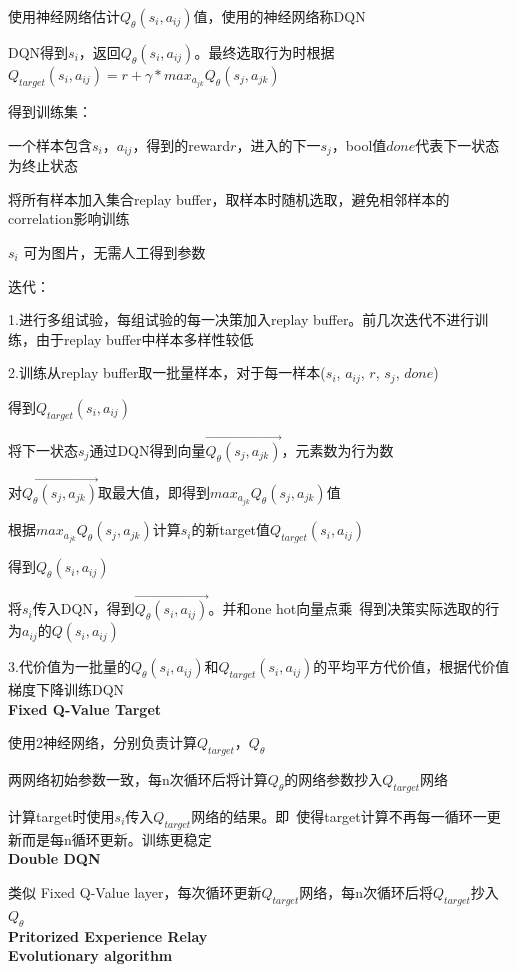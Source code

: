 \documentclass[UTF8]{ctexart}
\begin{document}
  使用神经网络估计$Q_{\theta}(s_i, a_{ij})$值，使用的神经网络称DQN
  
  DQN得到$s_i$，返回$Q_{\theta}(s_i, a_{ij})$。最终选取行为时根据$Q_{target}(s_i, a_{ij}) = r + \gamma * max_{a_{jk}} Q_{\theta}(s_j, a_{jk})$

  得到训练集：

  \quad 一个样本包含$s_i$，$a_{ij}$，得到的reward$r$，进入的下一$s_j$，bool值$done$代表下一状态为终止状态

  \quad 将所有样本加入集合replay buffer，取样本时随机选取，避免相邻样本的correlation影响训练

  \quad $s_i$ 可为图片，无需人工得到参数
  
  迭代：
  
  \quad 1.进行多组试验，每组试验的每一决策加入replay buffer。前几次迭代不进行训练，由于replay buffer中样本多样性较低
  
  \quad 2.训练从replay buffer取一批量样本，对于每一样本($s_i$, $a_{ij}$, $r$, $s_j$, $done$)

  \quad \quad 得到$Q_{target}(s_i, a_{ij})$
  
  \quad \quad \quad 将下一状态$s_j$通过DQN得到向量$\vec{Q_{\theta}(s_j, a_{jk})}$，元素数为行为数

  \quad \quad \quad 对$\vec{Q_{\theta}(s_j, a_{jk})}$取最大值，即得到$max_{a_{jk}} Q_{\theta}(s_j, a_{jk})$值

  \quad \quad \quad 根据$max_{a_{jk}} Q_{\theta}(s_j, a_{jk})$计算$s_i$的新target值$Q_{target}(s_i, a_{ij})$

  \quad \quad 得到$Q_{\theta}(s_i, a_{ij})$

  \quad \quad \quad 将$s_i$传入DQN，得到$\vec{Q_{\theta}(s_i, a_{ij})}$。并和one hot向量点乘\ 得到决策实际选取的行为$a_{ij}$的$Q(s_i, a_{ij})$

  \quad 3.代价值为一批量的$Q_{\theta}(s_i, a_{ij})$和$Q_{target}(s_i, a_{ij})$的平均平方代价值，根据代价值梯度下降训练DQN\\
\textbf{Fixed Q-Value Target}

  使用2神经网络，分别负责计算$Q_{target}$，$Q_{\theta}$

  两网络初始参数一致，每n次循环后将计算$Q_{\theta}$的网络参数抄入$Q_{target}$网络

  计算target时使用$s_i$传入$Q_{target}$网络的结果。即\ 使得target计算不再每一循环一更新而是每n循环更新。训练更稳定\\
\textbf{Double DQN} 

  类似 Fixed Q-Value layer，每次循环更新$Q_{target}$网络，每n次循环后将$Q_{target}$抄入$Q_{\theta}$\\
\textbf{Pritorized Experience Relay}\\
\textbf{Evolutionary algorithm}
\end{document}

